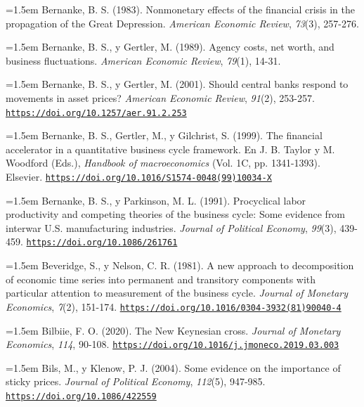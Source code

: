 \documentclass[10pt,a4paper]{article}
\begin{document}
\noindent\hangindent=1.5em Bernanke, B. S. (1983). Nonmonetary effects of the financial crisis in the propagation of the Great Depression. \textit{American Economic Review}, \textit{73}(3), 257-276.

\noindent\hangindent=1.5em Bernanke, B. S., y Gertler, M. (1989). Agency costs, net worth, and business fluctuations. \textit{American Economic Review}, \textit{79}(1), 14-31.

\noindent\hangindent=1.5em Bernanke, B. S., y Gertler, M. (2001). Should central banks respond to movements in asset prices? \textit{American Economic Review}, \textit{91}(2), 253-257. \href{https://doi.org/10.1257/aer.91.2.253}{\nolinkurl{https://doi.org/10.1257/aer.91.2.253}}

{\sloppy\noindent\hangindent=1.5em Bernanke, B. S., Gertler, M., y Gilchrist, S. (1999). The financial accelerator in a quantitative business cycle framework. En J. B. Taylor y M. Woodford (Eds.), \textit{Handbook of macroeconomics} (Vol. 1C, pp. 1341-1393). Elsevier. \href{https://doi.org/10.1016/S1574-0048(99)10034-X}{\nolinkurl{https://doi.org/10.1016/S1574-0048(99)10034-X}}\par}

{\sloppy\noindent\hangindent=1.5em Bernanke, B. S., y Parkinson, M. L. (1991). Procyclical labor productivity and competing theories of the business cycle: Some evidence from interwar U.S. manufacturing industries. \textit{Journal of Political Economy}, \textit{99}(3), 439-459. \href{https://doi.org/10.1086/261761}{\nolinkurl{https://doi.org/10.1086/261761}}\par}

\noindent\hangindent=1.5em Beveridge, S., y Nelson, C. R. (1981). A new approach to decomposition of economic time series into permanent and transitory components with particular attention to measurement of the business cycle. \textit{Journal of Monetary Economics}, \textit{7}(2), 151-174. \href{https://doi.org/10.1016/0304-3932(81)90040-4}{\nolinkurl{https://doi.org/10.1016/0304-3932(81)90040-4}}

\noindent\hangindent=1.5em Bilbiie, F. O. (2020). The New Keynesian cross. \textit{Journal of Monetary Economics}, \textit{114}, 90-108. \href{https://doi.org/10.1016/j.jmoneco.2019.03.003}{\nolinkurl{https://doi.org/10.1016/j.jmoneco.2019.03.003}}

\noindent\hangindent=1.5em Bils, M., y Klenow, P. J. (2004). Some evidence on the importance of sticky prices. \textit{Journal of Political Economy}, \textit{112}(5), 947-985. \href{https://doi.org/10.1086/422559}{\nolinkurl{https://doi.org/10.1086/422559}}
\end{document}
